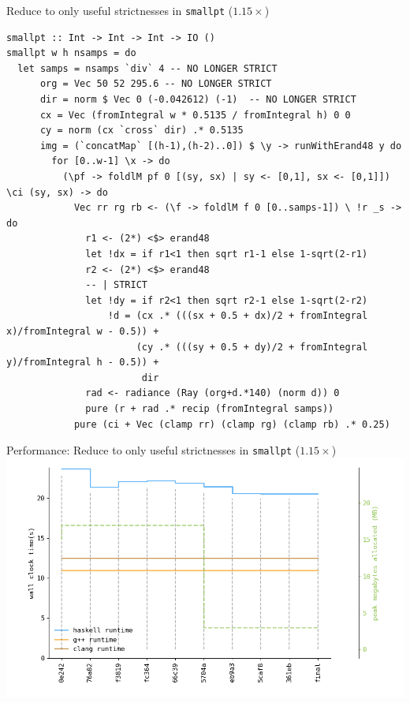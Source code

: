 \documentclass[8pt]{beamer}
\begin{document}
\begin{frame}[fragile]{ Reduce to only useful strictnesses in \texttt{smallpt} ($1.15\times$)}
\begin{verbatim}
smallpt :: Int -> Int -> Int -> IO ()
smallpt w h nsamps = do
  let samps = nsamps `div` 4 -- NO LONGER STRICT
      org = Vec 50 52 295.6 -- NO LONGER STRICT
      dir = norm $ Vec 0 (-0.042612) (-1)  -- NO LONGER STRICT
      cx = Vec (fromIntegral w * 0.5135 / fromIntegral h) 0 0
      cy = norm (cx `cross` dir) .* 0.5135
      img = (`concatMap` [(h-1),(h-2)..0]) $ \y -> runWithErand48 y do
        for [0..w-1] \x -> do
          (\pf -> foldlM pf 0 [(sy, sx) | sy <- [0,1], sx <- [0,1]]) \ci (sy, sx) -> do
            Vec rr rg rb <- (\f -> foldlM f 0 [0..samps-1]) \ !r _s -> do
              r1 <- (2*) <$> erand48
              let !dx = if r1<1 then sqrt r1-1 else 1-sqrt(2-r1)
              r2 <- (2*) <$> erand48
              -- | STRICT
              let !dy = if r2<1 then sqrt r2-1 else 1-sqrt(2-r2)
                  !d = (cx .* (((sx + 0.5 + dx)/2 + fromIntegral x)/fromIntegral w - 0.5)) +
                       (cy .* (((sy + 0.5 + dy)/2 + fromIntegral y)/fromIntegral h - 0.5)) +
                        dir
              rad <- radiance (Ray (org+d.*140) (norm d)) 0
              pure (r + rad .* recip (fromIntegral samps))
            pure (ci + Vec (clamp rr) (clamp rg) (clamp rb) .* 0.25)
\end{verbatim}

\end{frame}

\begin{frame}[fragile]{Performance: Reduce to only useful strictnesses in \texttt{smallpt}  ($1.15\times$)}
\includegraphics[height=0.6\textwidth]{perfdata-upto-361eb-gen.png}
\end{frame}
\end{document}
